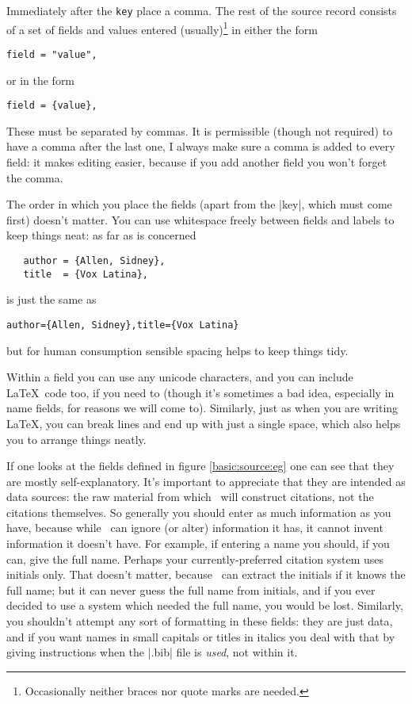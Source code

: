 Immediately after the \verb|key| place a comma. The rest of the
source record consists of a set of fields and values entered
(usually)\footnote{Occasionally neither braces nor quote marks are
    needed.} in either the form
\begin{center}\texttt{field = "value",}\end{center}
or in the form
\begin{center}\texttt{field = \{value\},}\end{center}
These must be separated by commas. It is permissible (though not
required) to have a comma after the last one, I always make sure a
comma is added to every field: it makes editing easier, because if you
add another field you won't forget the comma.

The order in which you place the fields (apart from the |key|, which
must come first) doesn't matter. You can use whitespace freely between
fields and labels to keep things neat: as far as  is
concerned
\begin{Verbatim}
   author = {Allen, Sidney},
   title  = {Vox Latina},
\end{Verbatim}
is just the same as
\begin{Verbatim}
author={Allen, Sidney},title={Vox Latina}
\end{Verbatim}
but for human consumption sensible spacing helps to keep things tidy.

Within a field you can use any unicode characters, and you can include
\LaTeX\ code too, if you need to (though it's sometimes a bad idea,
especially in name fields, for reasons we will come to). Similarly,
just as when you are writing \LaTeX, you can break lines and end up
with just a single space, which also helps you to arrange things
neatly.

If one looks at the fields defined in figure \ref{basic:source:eg} one
can see that they are mostly self-explanatory. It's important to
appreciate that they are intended as data sources: the raw material
from which \biblatex\ will construct citations, not the citations
themselves. So generally you should enter as much information as you
have, because while \biblatex\ can ignore (or alter) information it
has, it cannot invent information it doesn't have. For example, if
entering a name you should, if you can, give the full name. Perhaps
your currently-preferred citation system uses initials only. That
doesn't matter, because \biblatex\ can extract the initials if it
knows the full name; but it can never guess the full name from
initials, and if you ever decided to use a system which needed the
full name, you would be lost. Similarly, you shouldn't attempt any
sort of formatting in these fields: they are just data, and if you
want names in small capitals or titles in italics you deal with that
by giving instructions when the |.bib| file is \emph{used}, not within
it.

